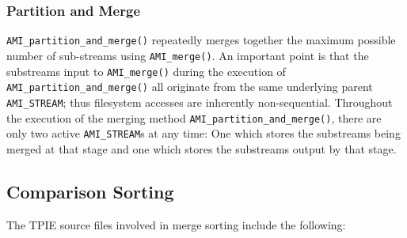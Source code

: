 \subsubsection{Partition and Merge}

\tobeextended

\lstinline|AMI_partition_and_merge()| repeatedly merges together the
maximum possible number of sub-streams using \lstinline|AMI_merge()|.
An important point is that the substreams input to
\lstinline|AMI_merge()| during the execution of
\lstinline|AMI_partition_and_merge()| all originate from the same
underlying parent \lstinline|AMI_STREAM|; thus filesystem accesses are
inherently non-sequential. Throughout the execution of the merging
method \lstinline|AMI_partition_and_merge()|, there are only two
active \lstinline|AMI_STREAM|s at any time: One which stores the
substreams being merged at that stage and one which stores the
substreams output by that stage.


\subsection{Comparison Sorting}


The TPIE source files involved in merge sorting include the following:

